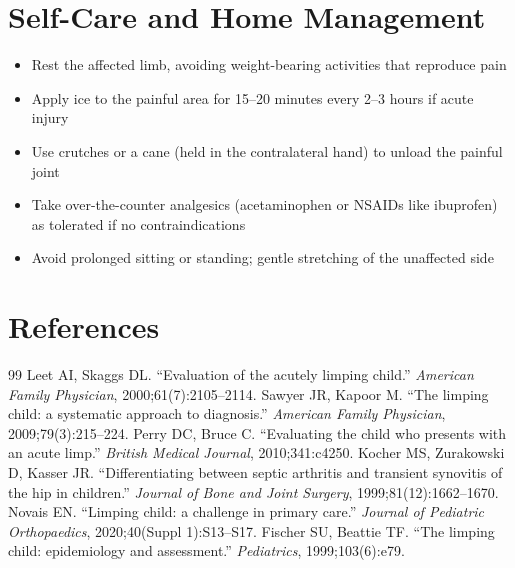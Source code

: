 \section*{Self-Care and Home Management}
\begin{itemize}
  \item Rest the affected limb, avoiding weight-bearing activities that reproduce pain
  \item Apply ice to the painful area for 15--20 minutes every 2--3 hours if acute injury
  \item Use crutches or a cane (held in the contralateral hand) to unload the painful joint
  \item Take over-the-counter analgesics (acetaminophen or NSAIDs like ibuprofen) as tolerated if no contraindications
  \item Avoid prolonged sitting or standing; gentle stretching of the unaffected side
\end{itemize}

\section*{References}
\begin{thebibliography}{99}
 Leet AI, Skaggs DL. ``Evaluation of the acutely limping child.'' \textit{American Family Physician}, 2000;61(7):2105--2114.
 Sawyer JR, Kapoor M. ``The limping child: a systematic approach to diagnosis.'' \textit{American Family Physician}, 2009;79(3):215--224.
 Perry DC, Bruce C. ``Evaluating the child who presents with an acute limp.'' \textit{British Medical Journal}, 2010;341:c4250.
 Kocher MS, Zurakowski D, Kasser JR. ``Differentiating between septic arthritis and transient synovitis of the hip in children.'' \textit{Journal of Bone and Joint Surgery}, 1999;81(12):1662--1670.
 Novais EN. ``Limping child: a challenge in primary care.'' \textit{Journal of Pediatric Orthopaedics}, 2020;40(Suppl 1):S13--S17.
 Fischer SU, Beattie TF. ``The limping child: epidemiology and assessment.'' \textit{Pediatrics}, 1999;103(6):e79.

\end{thebibliography}
